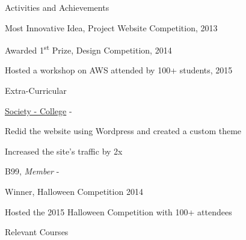 \documentclass[UKenglish]{resume} %
\begin{document}

\begin{rSection}{Activities and Achievements} \itemsep -2pt
    \item Most Innovative Idea, Project Website Competition, 2013
    \item Awarded 1\textsuperscript{st} Prize, Design Competition, 2014
    \item Hosted a workshop on AWS attended by 100+ students, 2015
\end{rSection}


\begin{rSection}{Extra-Curricular} \itemsep -3pt
    \begin{rSubsection}
        {\href{http://example.com/society/}{Society - College}}
        {  -  }
        {}{}

        \item Redid the website using Wordpress and created a custom theme
        \item Increased the site's traffic by 2x

    \end{rSubsection}


    \begin{rSubsection}
        {B99, {\normalfont \em Member}}
        {  -  }
        {}{}
        \item Winner, Halloween Competition 2014
        \item Hosted the 2015 Halloween Competition with 100+ attendees
    \end{rSubsection}

\end{rSection}


\begin{rSection}{Relevant Courses}
     \tab{}  
    \\  \tab{}  
    \\  \tab{}  
    \\  \tab{}  
\end{rSection}
\end{document}
